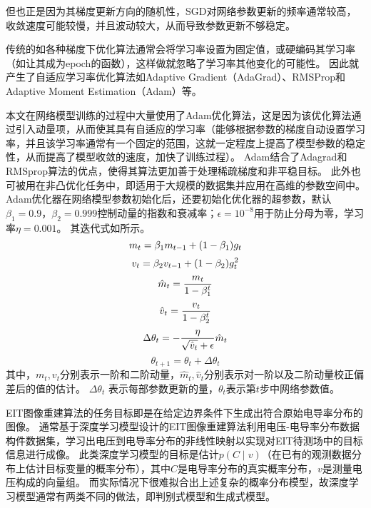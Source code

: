 但也正是因为其梯度更新方向的随机性，SGD对网络参数更新的频率通常较高，收敛速度可能较慢，并且波动较大，从而导致参数更新不够稳定。

传统的如各种梯度下优化算法通常会将学习率设置为固定值，或硬编码其学习率（如让其成为epoch的函数），这样做就忽略了学习率其他变化的可能性。
因此就产生了自适应学习率优化算法如Adaptive Gradient（AdaGrad）、RMSProp和Adaptive Moment Estimation（Adam）等。

本文在网络模型训练的过程中大量使用了Adam优化算法\cite{2014Adam}，这是因为该优化算法通过引入动量项，从而使其具有自适应的学习率（能够根据参数的梯度自动设置学习率，并且该学习率通常有一个固定的范围，这就一定程度上提高了模型参数的稳定性，从而提高了模型收敛的速度，加快了训练过程）。
Adam结合了Adagrad和RMSprop算法的优点，使得其算法更加善于处理稀疏梯度和非平稳目标。
此外也可被用在非凸优化任务中，即适用于大规模的数据集并应用在高维的参数空间中。
Adam优化器在网络模型参数初始化后，还要初始化优化器的超参数，默认$\beta_1 = 0.9$，$\beta_2 = 0.999$控制动量的指数和衰减率；$\epsilon = 10^{-8}$用于防止分母为零，学习率$\eta = 0.001$。
其迭代式如所示。
\begin{equation}
  \label{equation:Adamiter:a1}
  \centering
  m_t  = \beta_1 m_{t-1} + (1 - \beta_1) g_t
\end{equation}
\begin{equation}
  \label{equation:Adamiter:a2}
  \centering
  v_t  = \beta_2 v_{t-1} + (1 - \beta_2) g_t^2
\end{equation}
\begin{equation}
  \label{equation:Adamiter:a3}
  \centering  
  \hat{m}_t  = \frac{m_t}{1 - \beta_1^t}
\end{equation}
\begin{equation}
  \label{equation:Adamiter:a4}
  \centering
  \hat{v}_t  = \frac{v_t}{1 - \beta_2^t} 
\end{equation}
\begin{equation}
  \label{equation:Adamiter:a5}
  \centering
  \Delta \theta_t  = -\frac{\eta}{\sqrt{\hat{v}_t} + \epsilon} \hat{m}_t 
\end{equation}
\begin{equation}
  \label{equation:Adamiter:a6}
  \theta_{t+1} = \theta_t + \Delta \theta_t 
\end{equation}
其中，$m_t, v_t$分别表示一阶和二阶动量，$\hat{m}_t, \hat{v}_t$分别表示对一阶以及二阶动量校正偏差后的值的估计。
$\Delta\theta_t$ 表示每部参数更新的量，$\theta_t$表示第$t$步中网络参数值。

EIT图像重建算法的任务目标即是在给定边界条件下生成出符合原始电导率分布的图像。
通常基于深度学习模型设计的EIT图像重建算法利用电压-电导率分布数据构件数据集，学习出电压到电导率分布的非线性映射以实现对EIT待测场中的目标信息进行成像。
此类深度学习模型的目标是估计$p(C \mid v)$（在已有的观测数据分布上估计目标变量的概率分布），其中$C$是电导率分布的真实概率分布，$v$是测量电压构成的向量组。
而实际情况下很难拟合出上述复杂的概率分布模型，故深度学习模型通常有两类不同的做法，即判别式模型和生成式模型。

